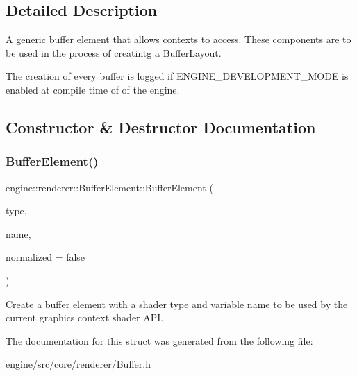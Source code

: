 \subsection{Detailed Description}
A generic buffer element that allows contexts to access. These components are to be used in the process of creatintg a \hyperlink{classengine_1_1renderer_1_1BufferLayout}{Buffer\+Layout}.

The creation of every buffer is logged if E\+N\+G\+I\+N\+E\+\_\+\+D\+E\+V\+E\+L\+O\+P\+M\+E\+N\+T\+\_\+\+M\+O\+DE is enabled at compile time of of the engine. 

\subsection{Constructor \& Destructor Documentation}
\mbox{\label{structengine_1_1renderer_1_1BufferElement_a76049a787d70b0adf984e65a9994bc1d}} 
\subsubsection{\texorpdfstring{Buffer\+Element()}{BufferElement()}}
{\footnotesize\ttfamily engine\+::renderer\+::\+Buffer\+Element\+::\+Buffer\+Element (\begin{DoxyParamCaption}\item[{Shader\+Data\+Type}]{type,  }\item[{const std\+::string \&}]{name,  }\item[{bool}]{normalized = {\ttfamily false} }\end{DoxyParamCaption})\hspace{0.3cm}{\ttfamily [inline]}}

Create a buffer element with a shader type and variable name to be used by the current graphics context shader A\+PI. 

The documentation for this struct was generated from the following file\+:\begin{DoxyCompactItemize}
\item 
engine/src/core/renderer/Buffer.\+h\end{DoxyCompactItemize}
